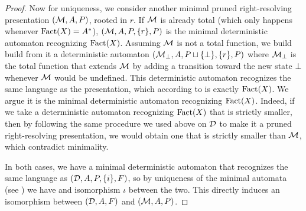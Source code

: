 \begin{proof}
	Now for uniqueness, we consider another minimal pruned right-resolving presentation $({\mathcal{M}},A,P)$, rooted in $r$. If ${\mathcal{M}}$ is already total (which only happens whenever $\mathrm{Fact}(X) = A^*$), $({\mathcal{M}},A,P,\{r\},P)$ is the minimal deterministic automaton recognizing $\mathrm{Fact}(X)$. Assuming ${\mathcal{M}}$ is not a total function, we build build from it a deterministic automaton $({\mathcal{M}}_\bot,A,P \sqcup \{\bot\},\{r\},P)$ where ${\mathcal{M}}_\bot$ is the total function that extends ${\mathcal{M}}$ by adding a transition toward the new state $\bot$ whenever ${\mathcal{M}}$ would be undefined. This deterministic automaton recognizes the same language as the presentation, which according to  is exactly $\mathrm{Fact}(X)$. We argue it is the minimal deterministic automaton recognizing $\mathrm{Fact}(X)$. Indeed, if we take a deterministic automaton recognizing $\mathrm{Fact}(X)$ that is strictly smaller, then by following the same procedure we used above on ${\mathcal{D}}$ to make it a pruned right-resolving presentation, we would obtain one that is strictly smaller than ${\mathcal{M}}$, which contradict minimality.
	
	In both cases, we have a minimal deterministic automaton that recognizes the same language as $({\mathcal{D}},A,P,\{i\},F)$, so by uniqueness of the minimal automata (see \cite{DBLP:books/daglib/0016921}) we have and isomorphism $\iota$ between the two. This directly induces an isomorphism between $({\mathcal{D}},A,F)$ and $({\mathcal{M}},A,P)$.
\end{proof}


